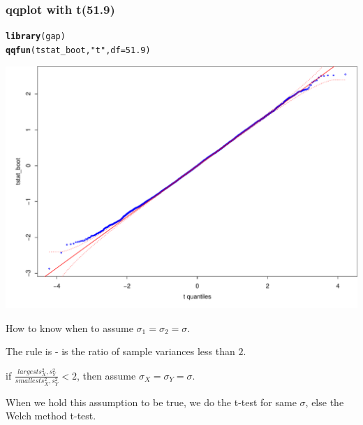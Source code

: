 \documentclass{beamer}\usepackage[]{graphicx}\usepackage[]{color}
\makeatletter
\newcommand{\hlnum}[1]{\textcolor[rgb]{0.2,0.2,0.2}{#1}}%
\newcommand{\hlstr}[1]{\textcolor[rgb]{0.2,0.2,0.2}{#1}}%
\newcommand{\hlstd}[1]{\textcolor[rgb]{0.102,0.102,0.102}{#1}}%
\newcommand{\hlkwc}[1]{\textcolor[rgb]{0.2,0.2,0.2}{#1}}%
\newcommand{\hlkwd}[1]{\textcolor[rgb]{0.102,0.102,0.102}{\textbf{#1}}}%
\newenvironment{kframe}{%
 \def\at@end@of@kframe{}%
 \ifinner\ifhmode%
  \def\at@end@of@kframe{\end{minipage}}%
  \begin{minipage}{\columnwidth}%
 \fi\fi%
 \def\FrameCommand##1{\hskip\@totalleftmargin \hskip-\fboxsep
 \colorbox{shadecolor}{##1}\hskip-\fboxsep
     \hskip-\linewidth \hskip-\@totalleftmargin \hskip\columnwidth}%
 \MakeFramed {\advance\hsize-\width
   \@totalleftmargin\z@ \linewidth\hsize
   \@setminipage}}%
 {\par\unskip\endMakeFramed%
 \at@end@of@kframe}
\newenvironment{knitrout}{}{} %
\renewenvironment{knitrout}{\begin{spacing}{0.75}\begin{tiny}}{\end{tiny}\end{spacing}}
\makeatother
\begin{document}
\begin{frame}[fragile]
\frametitle{qqplot with t(51.9)}

\begin{knitrout}\small
{}\color{fgcolor}\begin{kframe}
\begin{alltt}
\hlkwd{library}\hlstd{(gap)}
\hlkwd{qqfun}\hlstd{(tstat_boot,} \hlstr{"t"}\hlstd{,} \hlkwc{df}\hlstd{=}\hlnum{51.9}\hlstd{)}
\end{alltt}
\end{kframe}

{\centering \includegraphics[width=0.99\linewidth]{figure/graphics-unnamed-chunk-13-1} 

}



\end{knitrout}

\end{frame}

\begin{frame}[fragile]

How to know when to assume $\sigma_1 = \sigma_2 = \sigma$. \pause \newline

The rule is  - is the ratio of sample variances less than $2$. \pause \newline

if $\frac{largest{s^2_X, s^2_Y}}{smallest{s^2_X, s^2_Y}} < 2$, then assume $\sigma_X = \sigma_Y = \sigma$. \pause \newline

When we hold this assumption to be true, we do the t-test for same $\sigma$, else the Welch method t-test.

\end{frame}
\end{document}
